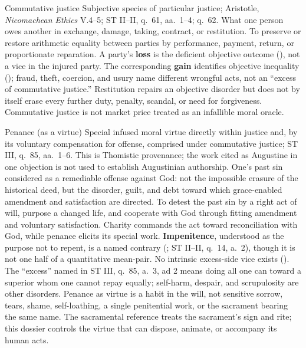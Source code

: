 \virtuedossier
  {Commutative justice}
  {Subjective species of particular justice; Aristotle, \emph{Nicomachean Ethics} V.4--5; ST II--II, q.~61, aa.~1--4; q.~62.}
  {What one person owes another in exchange, damage, taking, contract, or restitution.}
  {To preserve or restore arithmetic equality between parties by performance, payment, return, or proportionate reparation.}
  {A party's \textbf{loss} is the deficient objective outcome (), not a vice in the injured party.}
  {The corresponding \textbf{gain} identifies objective inequality (); fraud, theft, coercion, and usury name different wrongful acts, not an “excess of commutative justice.”}
  {Restitution repairs an objective disorder but does not by itself erase every further duty, penalty, scandal, or need for forgiveness. Commutative justice is not market price treated as an infallible moral oracle.}

\virtuedossier
  {Penance (as a virtue)}
  {Special infused moral virtue directly within justice and, by its voluntary compensation for offense, comprised under commutative justice; ST III, q.~85, aa.~1--6. This is Thomistic provenance; the work cited as Augustine in one objection is not used to establish Augustinian authorship.}
  {One's past sin considered as a remediable offense against God: not the impossible erasure of the historical deed, but the disorder, guilt, and debt toward which grace-enabled amendment and satisfaction are directed.}
  {To detest the past sin by a right act of will, purpose a changed life, and cooperate with God through fitting amendment and voluntary satisfaction. Charity commands the act toward reconciliation with God, while penance elicits its special work.}
  {\textbf{Impenitence}, understood as the purpose not to repent, is a named contrary (; ST II--II, q.~14, a.~2), though it is not one half of a quantitative mean-pair.}
  {No intrinsic excess-side vice exists (). The “excess” named in ST III, q.~85, a.~3, ad 2 means doing all one can toward a superior whom one cannot repay equally; self-harm, despair, and scrupulosity are other disorders.}
  {Penance as virtue is a habit in the will, not sensitive sorrow, tears, shame, self-loathing, a single penitential work, or the sacrament bearing the same name. The sacramental reference treats the sacrament's sign and rite; this dossier controls the virtue that can dispose, animate, or accompany its human acts.}

